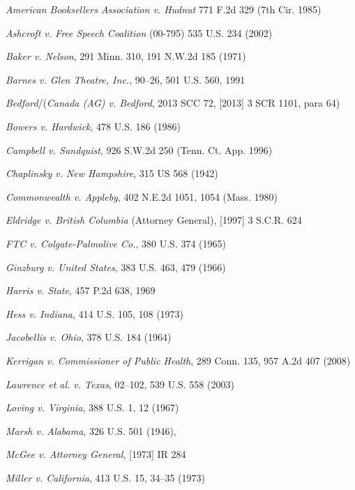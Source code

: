 \documentclass[paper=a4,book,openany]{jlreq}
\newenvironment{mylist}{\small \list{}{}{}   \itemindent=-1\zw}{\endlist}
\begin{document}
\begin{mylist}

\item \emph{American Booksellers Association v. Hudnut} 771 F.2d 329 (7th Cir. 1985)
\item \emph{Ashcroft v. Free Speech Coalition} (00-795) 535 U.S. 234 (2002)
\item \emph{Baker v. Nelson}, 291 Minn. 310, 191 N.W.2d 185 (1971)
\item \emph{Barnes v. Glen Theatre, Inc.}, 90--26, 501 U.S. 560, 1991
\item \emph{Bedford}/(\emph{Canada (AG) v. Bedford}, 2013 SCC 72, [2013] 3 SCR 1101, para 64)
\item \emph{Bowers v. Hardwick}, 478 U.S. 186 (1986)
\item \emph{Campbell v. Sundquist}, 926 S.W.2d 250 (Tenn. Ct. App. 1996)
\item \emph{Chaplinsky v. New Hampshire}, 315 US 568 (1942)
\item \emph{Commonwealth v. Appleby}, 402 N.E.2d 1051, 1054 (Mass. 1980)
\item \emph{Eldridge v. British Columbia} (Attorney General), [1997] 3 S.C.R. 624
\item \emph{FTC v. Colgate-Palmolive Co.}, 380 U.S. 374 (1965)
\item \emph{Ginzburg v. United States}, 383 U.S. 463, 479 (1966)
\item \emph{Harris v. State}, 457 P.2d 638, 1969
\item \emph{Hess v. Indiana}, 414 U.S. 105, 108 (1973)
\item \emph{Jacobellis v. Ohio}, 378 U.S. 184 (1964) 
\item \emph{Kerrigan v. Commissioner of Public Health}, 289 Conn. 135, 957 A.2d 407 (2008)
\item \emph{Lawrence et al. v. Texas}, 02--102, 539 U.S. 558 (2003)
\item \emph{Loving v. Virginia}, 388 U.S. 1, 12 (1967)
\item \emph{Marsh v. Alabama}, 326 U.S. 501 (1946),
\item \emph{McGee v. Attorney General}, [1973] IR 284
\item \emph{Miller v. California}, 413 U.S. 15, 34--35 (1973)

\end{mylist}
\end{document}
